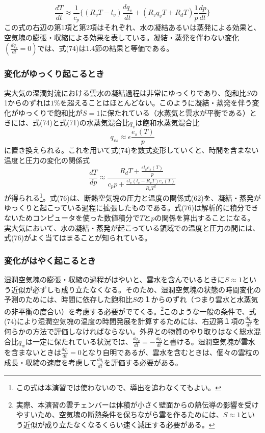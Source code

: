 \documentclass{jsarticle}
\begin{document}
\begin{equation}
\frac{dT}{dt} \approx \frac{1}{c_{p}}{\bigg \{}(R_{v}T-l_{v})\frac{dq_{v}}{dt}+(R_{v}q_{v}T+R_{d}T)\frac{1}{p}\frac{dp}{dt}{\bigg \}}
\end{equation}
この式の右辺の第1項と第2項はそれぞれ、水の凝結あるいは蒸発による効果と、空気塊の膨張・収縮による効果を表している。凝結・蒸発を伴わない変化$(\frac{dq_{v}}{dt}=0)$では、式(74)は1.4節の結果と等価である。

\subsubsection{変化がゆっくり起こるとき}
実大気の湿潤対流における雲水の凝結過程は非常にゆっくりであり、飽和比$S$の1からのずれは$1\%$を超えることはほとんどない。このように凝結・蒸発を伴う変化がゆっくりで飽和比が$S=1$に保たれている（水蒸気と雲水が平衡である）ときには、式(74)と式(71)の水蒸気混合比$q_{v}$は飽和水蒸気混合比
\begin{equation}
q_{vs}\approx \epsilon \frac{e_s(T)}{p}
\end{equation}
に置き換えられる。これを用いて式(74)を数式変形していくと、時間を含まない温度と圧力の変化の関係式
\begin{equation}
\frac{dT}{dp} \approx \frac{ R_{d}T + \frac{\epsilon l_{v}e_{s}(T)}{p} }{c_{p}p + \frac{\epsilon l_{v}(l_{v}-R_{v}T)e_{s}(T)}{R_{v}T^2}}
\end{equation}
が得られる\footnote{この式は本演習では使わないので、導出を追わなくてもよい。}。式(76)は、断熱空気塊の圧力と温度の関係式(62)を、凝結・蒸発がゆっくりと起こっている過程に拡張したものである。式(76)は解析的に積分できないためコンピュータを使った数値積分で$T$と$p$の関係を算出することになる。実大気において、水の凝結・蒸発が起こっている領域での温度と圧力の間には、式(76)がよく当てはまることが知られている。

\subsubsection{変化がはやく起こるとき}
湿潤空気塊の膨張・収縮の過程がはやいと、雲水を含んでいるときに$S\approx 1$という近似が必ずしも成り立たなくなる。そのため、湿潤空気塊の状態の時間変化の予測のためには、時間に依存した飽和比$Sの１からのずれ$（つまり雲水と水蒸気の非平衡の度合い）を考慮する必要がでてくる。\footnote{実際、本演習の雲チェンバーは体積が小さく壁面からの熱伝導の影響を受けやすいため、空気塊の断熱条件を保ちながら雲を作るためには、$S\approx 1$という近似が成り立たなくなるくらい速く減圧する必要がある。}このような一般の条件で、式(74)により湿潤空気塊の温度の時間発展を計算するためには、右辺第１項の$\frac{dq_{v}}{dt}$を何らかの方法で評価しなければならない。外界との物質のやり取りはなく総水混合比$q_{w}$は一定に保たれている状況では、$\frac{dq_{v}}{dt}=-\frac{dq_{l}}{dt}$と書ける。湿潤空気塊が雲水を含まないときは$\frac{dq_{l}}{dt}=0$となり自明であるが、雲水を含むときは、個々の雲粒の成長・収縮の速度を考慮して$\frac{dq_{l}}{dt}$を評価する必要がある。
\end{document}
